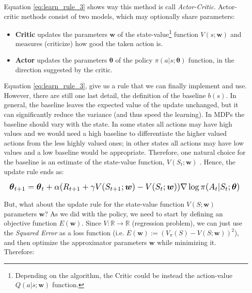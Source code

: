 \documentclass[twoside,twocolumn]{article}
\begin{document}
Equation \ref{eq:learn_rule_3} shows way this method is call \emph{Actor-Critic}. Actor-critic methods consist of two models, which may optionally share parameters:
\begin{itemize}
  \item \textbf{Critic} updates the parameters $\boldsymbol{w}$ of the state-value\footnote{Depending on the algorithm, the Critic could be instead the action-value $Q(a|s;\boldsymbol{w})$ function.} function $V(s; \boldsymbol{w})$ and measures (criticize) how good the taken action is.
  \item \textbf{Actor} updates the parameters $\boldsymbol{\theta}$ of the policy $\pi(a|s; \boldsymbol{\theta})$ function, in the direction suggested by the critic.
\end{itemize}

Equation \ref{eq:learn_rule_3}, give us a rule that we can finally implement and use. However, there are still one last detail, the definition of the baseline $b(s)$. In general, the baseline leaves the expected value of the update unchanged, but it can significantly reduce the variance (and thus speed the learning). In MDPs the baseline should vary with the state.
In some states all actions may have high values and we would need a high baseline to differentiate the higher valued actions from the less highly valued ones; in other states all actions may have low values and a low baseline would be appropriate.
Therefore, one natural choice for the baseline is an estimate of the state-value function, $V(S_{t};\boldsymbol{w})$ \cite{Sutton1998}.
Hence, the update rule ends as:

\begin{equation*}
  \resizebox{1\linewidth}{!}{%
  $
    \boldsymbol{\theta}_{t+1} = \boldsymbol{\theta}_{t} + \alpha (R_{t+1} + \gamma V(S_{t+1};\boldsymbol{w}) - V(S_{t};\boldsymbol{w})) \nabla \log{\pi (A_t|S_t; \boldsymbol{\theta})}
  $
  }
\end{equation*}

But, what about the update rule for the state-value function $V(S;\boldsymbol{w})$ parameters $\boldsymbol{w}$? As we did with the policy, we need to start by defining an objective function $E(\boldsymbol{w})$. Since $V: \mathbb{R} \rightarrow \mathbb{R}$ (regression problem), we can just use the \emph{Squared Error} as a loss function (i.e. $E(\boldsymbol{w}):=(V_{\pi}(S) - V(S;\boldsymbol{w}))^2$), and then optimize the approximator parameters $\boldsymbol{w}$ while minimizing it. Therefore:
\end{document}
